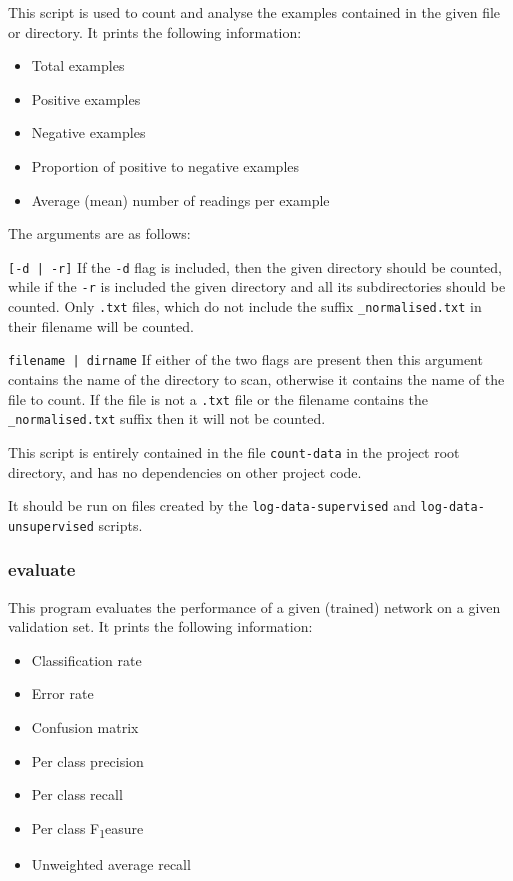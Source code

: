 \documentclass[a4paper]{article}
\begin{document}
This script is used to count and analyse the examples contained in the given file or directory. It prints the following information:

\begin{itemize}
\item Total examples
\item Positive examples
\item Negative examples
\item Proportion of positive to negative examples
\item Average (mean) number of readings per example
\end{itemize}

The arguments are as follows:

\lstinline{[-d | -r]} If the \lstinline{-d} flag is included, then the given directory should be counted, while if the \lstinline{-r} is included the given directory and all its subdirectories should be counted. Only \lstinline{.txt} files, which do not include the suffix \lstinline{_normalised.txt} in their filename will be counted.

\lstinline{filename | dirname} If either of the two flags are present then this argument contains the name of the directory to scan, otherwise it contains the name of the file to count. If the file is not a \lstinline{.txt} file or the filename contains the \lstinline{_normalised.txt} suffix then it will not be counted.

This script is entirely contained in the file \lstinline{count-data} in the project root directory, and has no dependencies on other project code.

It should be run on files created by the \lstinline{log-data-supervised} and \lstinline{log-data-unsupervised} scripts.

\subsubsection{evaluate}
\label{subsubsec:dc_csa_evaluate}

This program evaluates the performance of a given (trained) network on a given validation set. It prints the following information:

\begin{itemize}
\item Classification rate
\item Error rate
\item Confusion matrix
\item Per class precision
\item Per class recall
\item Per class F\texorpdfstring{\textsubscript{1}} measure
\item Unweighted average recall
\end{itemize}
\end{document}
